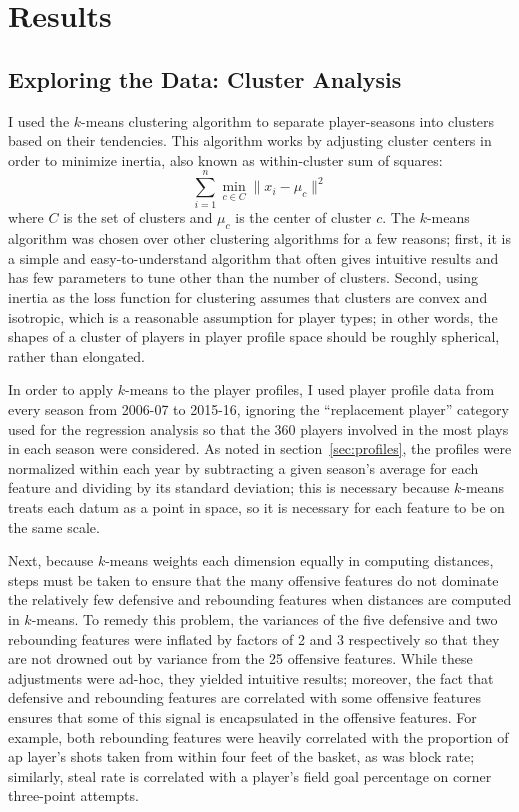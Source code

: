 
\chapter{Results}
\label{ch:results}

\section{Exploring the Data: Cluster Analysis}

 I used the $k$-means
clustering algorithm to separate player-seasons into clusters based on their
tendencies. This algorithm works by adjusting cluster centers in order to minimize
inertia, also known as within-cluster sum of squares: $$ \sum_{i=1}^n \min_{c \in C}
\lVert x_i - \mu_c \rVert^2 $$ where $C$ is the set of clusters and $\mu_c$ is the
center of cluster $c$. The $k$-means algorithm was chosen over other clustering
algorithms for a few reasons; first, it is a simple and easy-to-understand algorithm
that often gives intuitive results and has few parameters to tune other than the
number of clusters. Second, using inertia as the loss function for clustering
assumes that clusters are convex and isotropic, which is a reasonable assumption for
player types; in other words, the shapes of a cluster of players in player profile
space should be roughly spherical, rather than elongated.

In order to apply $k$-means to the player profiles, I used player profile data from
every season from 2006-07 to 2015-16, ignoring the ``replacement player'' category
used for the regression analysis so that the 360 players involved in the most plays
in each season were considered. As noted in section~\ref{sec:profiles}, the profiles
were normalized within each year by subtracting a given season's average for each
feature and dividing by its standard deviation; this is necessary because $k$-means
treats each datum as a point in space, so it is necessary for each feature to be on
the same scale.

Next, because $k$-means weights each dimension equally in computing distances, steps
must be taken to ensure that the many offensive features do not dominate the
relatively few defensive and rebounding features when distances are computed in
$k$-means. To remedy this problem, the variances of the five defensive and two
rebounding features were inflated by factors of 2 and 3 respectively so that they
are not drowned out by variance from the 25 offensive features. While these
adjustments were ad-hoc, they yielded intuitive results; moreover, the fact that
defensive and rebounding features are correlated with some offensive features
ensures that some of this signal is encapsulated in the offensive features. For
example, both rebounding features were heavily correlated with the proportion of ap
layer's shots taken from within four feet of the basket, as was block rate;
similarly, steal rate is correlated with a player's field goal percentage on corner
three-point attempts.

